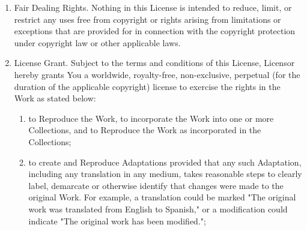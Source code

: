 \documentclass{article}
\begin{document}
{\begin{enumerate}
\begin{enumerate}
		\item "You" means an individual or entity exercising rights under this License who has not previously violated the terms of this License with respect to the Work, or who has received express permission from the Licensor to exercise rights under this License despite a previous violation.
		\item "Publicly Perform" means to perform public recitations of the Work and to communicate to the public those public recitations, by any means or process, including by wire or wireless means or public digital performances; to make available to the public Works in such a way that members of the public may access these Works from a place and at a place individually chosen by them; to perform the Work to the public by any means or process and the communication to the public of the performances of the Work, including by public digital performance; to broadcast and rebroadcast the Work by any means including signs, sounds or images.
		\item "Reproduce" means to make copies of the Work by any means including without limitation by sound or visual recordings and the right of fixation and reproducing fixations of the Work, including storage of a protected performance or phonogram in digital form or other electronic medium.
	\end{enumerate}
	\item Fair Dealing Rights. Nothing in this License is intended to reduce, limit, or restrict any uses free from copyright or rights arising from limitations or exceptions that are provided for in connection with the copyright protection under copyright law or other applicable laws.
	\item License Grant. Subject to the terms and conditions of this License, Licensor hereby grants You a worldwide, royalty-free, non-exclusive, perpetual (for the duration of the applicable copyright) license to exercise the rights in the Work as stated below:
	\begin{enumerate}
		\item to Reproduce the Work, to incorporate the Work into one or more Collections, and to Reproduce the Work as incorporated in the Collections;
		\item to create and Reproduce Adaptations provided that any such Adaptation, including any translation in any medium, takes reasonable steps to clearly label, demarcate or otherwise identify that changes were made to the original Work. For example, a translation could be marked "The original work was translated from English to Spanish," or a modification could indicate "The original work has been modified.";

\end{enumerate}
\end{enumerate}}
\end{document}

